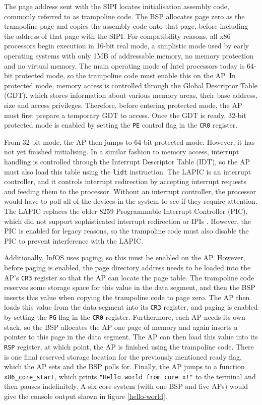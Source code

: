 \documentclass[bsc,frontabs,singlespacing,parskip,deptreport]{infthesis}
\begin{document}
The page address sent with the SIPI locates initialisation assembly code, commonly referred to as trampoline code. The BSP allocates page zero as the trampoline page and copies the assembly code onto that page, before including the address of that page with the SIPI. For compatibility reasons, all x86 processors begin execution in 16-bit real mode, a simplistic mode used by early operating systems with only 1MB of addressable memory, no memory protection and no virtual memory. The main operating mode of Intel processors today is 64-bit protected mode, so the trampoline code must enable this on the AP. In protected mode, memory access is controlled through the Global Descriptor Table (GDT), which stores information about various memory areas, their base address, size and access privileges. Therefore, before entering protected mode, the AP must first prepare a temporary GDT to access. Once the GDT is ready, 32-bit protected mode is enabled by setting the \verb|PE| control flag in the \verb|CR0| register. 

From 32-bit mode, the AP then jumps to 64-bit protected mode. However, it has not yet finished initialising. In a similar fashion to memory access, interrupt handling is controlled through the Interrupt Descriptor Table (IDT), so the AP must also load this table using the \verb|lidt| instruction. The LAPIC is an interrupt controller, and it controls interrupt redirection by accepting interrupt requests and feeding them to the processor. Without an interrupt controller, the processor would have to poll all of the devices in the system to see if they require attention. The LAPIC replaces the older 8259 Programmable Interrupt Controller (PIC), which did not support sophisticated interrupt redirection or IPIs \cite{osdev-apic}. However, the PIC is enabled for legacy reasons, so the trampoline code must also disable the PIC to prevent interference with the LAPIC. 

Additionally, InfOS uses paging, so this must be enabled on the AP. However, before paging is enabled, the page directory address needs to be loaded into the AP's \verb|CR3| register so that the AP can locate the page table. The trampoline code reserves some storage space for this value in the data segment, and then the BSP inserts this value when copying the trampoline code to page zero. The AP then loads this value from the data segment into its \verb|CR3| register, and paging is enabled by setting the \verb|PG| flag in the \verb|CR0| register. Furthermore, each AP needs its own stack, so the BSP allocates the AP one page of memory and again inserts a pointer to this page in the data segment. The AP can then load this value into its \verb|RSP| register, at which point, the AP is finished using the trampoline code. There is one final reserved storage location for the previously mentioned ready flag, which the AP sets and the BSP polls for. Finally, the AP jumps to a function \verb|x86_core_start|, which prints \verb|"Hello world from core x!"| to the terminal and then pauses indefinitely. A six core system (with one BSP and five APs) would give the console output shown in figure \ref{hello-world}.
\end{document}
